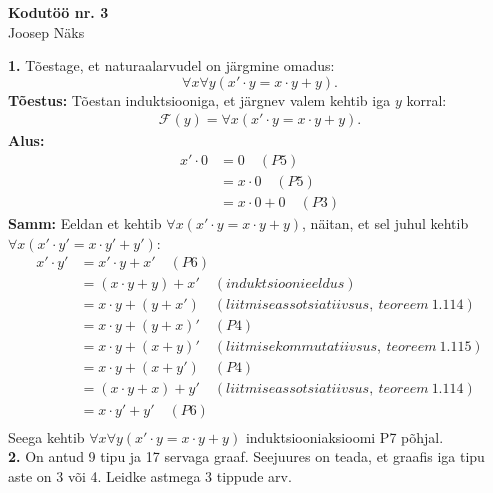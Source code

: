 \documentclass{article}
\begin{document}
\begin{center}
\Large\textbf{Kodut\"o\"o nr. 3}\\
Joosep N\"aks
\end{center}
\textbf{1.} T\~oestage, et naturaalarvudel on j\"argmine omadus:\\
\begin{equation*}
\forall x \forall y (x'\cdot y=x\cdot y+y).
\end{equation*}
\textbf{T\~oestus:} T\~oestan induktsiooniga, et j\"argnev valem kehtib iga $y$ korral:\\
\begin{equation*}
\begin{aligned}
\mathcal{F}(y) = \forall x (x'\cdot y=x\cdot y+y).
\end{aligned}
\end{equation*}
\textbf{Alus:}
\begin{equation*}
\begin{aligned}
x'\cdot0&=0\quad(P5)\\
&=x\cdot0\quad(P5)\\
&=x\cdot0+0\quad(P3)
\end{aligned}
\end{equation*}
\textbf{Samm:} Eeldan et kehtib $\forall x (x'\cdot y=x\cdot y+y)$, n\"aitan, et sel juhul kehtib $\forall x (x'\cdot y'=x\cdot y'+y')$:
\begin{equation*}
\begin{aligned}
x'\cdot y'&=x'\cdot y+x'\quad(P6)\\
&=(x\cdot y+ y)+x'\quad(induktsioonieeldus)\\
&=x\cdot y+ (y+x')\quad(liitmise assotsiatiivsus,\ teoreem\ 1.114)\\
&=x\cdot y+ (y+x)'\quad(P4)\\
&=x\cdot y+ (x+y)'\quad(liitmise kommutatiivsus,\ teoreem\ 1.115)\\
&=x\cdot y+ (x+y')\quad(P4)\\
&=(x\cdot y+ x)+y'\quad(liitmise assotsiatiivsus,\ teoreem\ 1.114)\\
&=x\cdot y'+y'\quad(P6)\\
\end{aligned}
\end{equation*}
Seega kehtib $\forall x \forall y (x'\cdot y=x\cdot y+y)$ induktsiooniaksioomi P7 p\~ohjal.
\pagebreak\\
\textbf{2.} On antud 9 tipu ja 17 servaga graaf. Seejuures on teada, et graafis iga tipu aste on 3 v\~oi 4. Leidke astmega 3 tippude arv.\\
\end{document}
